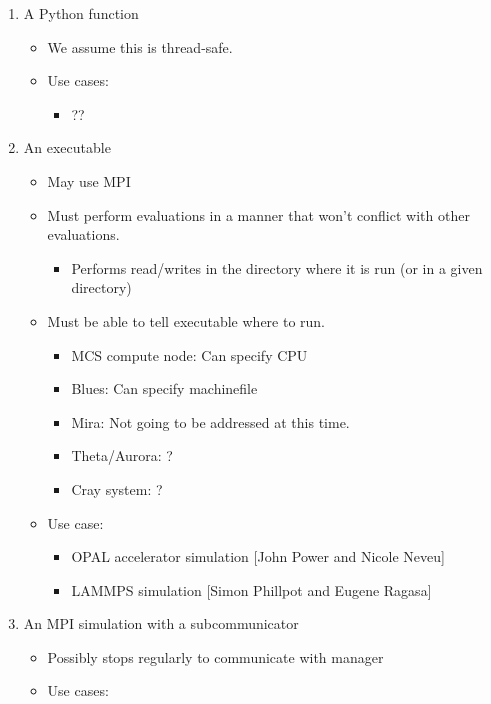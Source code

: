 \documentclass{article}
\begin{document}
\begin{enumerate}
  \item A Python function
    \begin{itemize}
      \item We assume this is thread-safe.
      \item Use cases: 
        \begin{itemize}
          \item ??
        \end{itemize}
    \end{itemize}
  \item An executable
    \begin{itemize}
      \item May use MPI
      \item Must perform evaluations in a manner that won't conflict with other evaluations. 
        \begin{itemize}
          \item Performs read/writes in the directory where it is run (or in a given directory)
        \end{itemize}
      \item Must be able to tell executable where to run.
        \begin{itemize}
          \item MCS compute node: Can specify CPU
          \item Blues: Can specify machinefile
          \item Mira: Not going to be addressed at this time.
          \item Theta/Aurora: ?
          \item Cray system: ?
        \end{itemize}
      \item Use case: 
        \begin{itemize}
          \item OPAL accelerator simulation [John Power and Nicole Neveu]
          \item LAMMPS simulation [Simon Phillpot and Eugene Ragasa]
        \end{itemize}
    \end{itemize}
  \item An MPI simulation with a subcommunicator
    \begin{itemize}
      \item Possibly stops regularly to communicate with manager
      \item Use cases: 
        \begin{itemize}

\end{itemize}
\end{itemize}
\end{enumerate}
\end{document}
